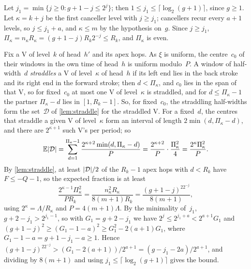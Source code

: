\begin{informalproof}
Let $j_1=\min\{j\ge0:g+1-j\le2^j\}$; then $1\le j_1\le\lceil\log_2(g+1)\rceil$, since $g\ge1$. Let $\kappa=k+j$ be the first
canceller level with $j\ge j_1$; cancellers recur every $a+1$ levels, so $j\le j_1+a$, and $\kappa\le m$ by the hypothesis
on~$g$. Since $j\ge j_1$, $\Pi_\kappa=n_\kappa R_\kappa=(g+1-j)R_k2^{-j}\le R_k$, and $\Pi_\kappa$ is even.

Fix a V of level~$k$ of head~$h'$ and its apex hops. As $\xi$ is uniform, the centre~$c_0$ of their windows in the own time of
head~$h$ is uniform modulo~$P$. A window of half-width~$d$ \emph{straddles} a V of level~$\kappa$ of head~$h$ if its left end
lies in the back stroke and its right end in the forward stroke; then $d<\Pi_\kappa$, and $c_0$ lies in the span of that V,
so for fixed~$c_0$ at most one V of level~$\kappa$ is straddled, and for $d\le\Pi_\kappa-1$ the partner
$\Pi_\kappa-d$ lies in $[1,R_k-1]$. So, for fixed~$c_0$, the straddling half-widths form the set~$\mathcal D$ of
\cref{lem:straddle} for the straddled V. For a fixed~$d$, the centres that straddle a given V of level~$\kappa$ form an interval
of length $2\min(d,\Pi_\kappa-d)$, and there are $2^{\kappa+1}$ such V's per period; so
\[
  \mathbb E\lvert \mathcal D \rvert=\sum_{d=1}^{\Pi_\kappa-1}\frac{2^{\kappa+2}\min(d,\Pi_\kappa-d)}P
  =\frac{2^{\kappa+2}}P\cdot\frac{\Pi_\kappa^2}4=\frac{2^\kappa\Pi_\kappa^2}P .
\]
By \cref{lem:straddle}, at least $\lvert \mathcal D \rvert/2$ of the $R_k-1$ apex hops with $d<R_k$ have $F\le-Q-1$, so the expected
fraction is at least
\[
  \frac{2^{\kappa-1}\Pi_\kappa^2}{PR_k}=\frac{n_\kappa^2R_\kappa}{8(m+1)R_k}=\frac{(g+1-j)^22^{-j}}{8(m+1)},
\]
using $2^\kappa=\Lambda/R_\kappa$ and $P=4(m+1)\Lambda$. By the minimality of~$j_1$, $g+2-j_1>2^{j_1-1}$, so with
$G_1=g+2-j_1$ we have $2^j\le2^{j_1+a}<2^{a+1}G_1$ and $(g+1-j)^2\ge(G_1-1-a)^2\ge G_1^2-2(a+1)G_1$, where
$G_1-1-a=g+1-j_1-a\ge1$. Hence $(g+1-j)^22^{-j}>(G_1-2(a+1))/2^{a+1}=(g-j_1-2a)/2^{a+1}$, and dividing by $8(m+1)$ and using
$j_1\le\lceil\log_2(g+1)\rceil$ gives the bound.
\end{informalproof}

